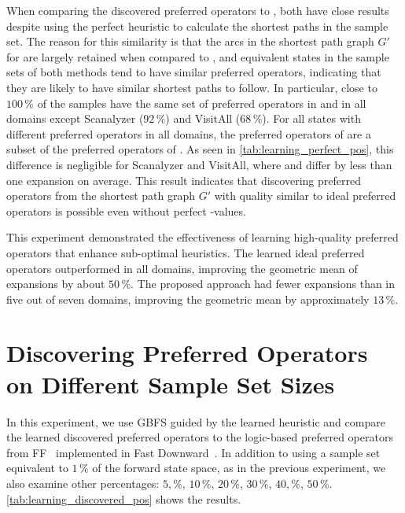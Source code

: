 \documentclass[ppgc,diss,english]{iiufrgs}
\begin{document}

When comparing the discovered preferred operators \pogstar to \pog, both have close results despite \pogstar using the perfect heuristic \hstar to calculate the shortest paths in the sample set. The reason for this similarity is that the arcs in the shortest path graph $G'$ for \pog are largely retained when compared to \pogstar, and equivalent states in the sample sets of both methods tend to have similar preferred operators, indicating that they are likely to have similar shortest paths to follow. In particular, close to $100\,\%$ of the samples have the same set of preferred operators in \pogstar and \pog in all domains except Scanalyzer ($92\,\%$) and VisitAll ($68\,\%$). For all states with different preferred operators in all domains, the preferred operators of \pog are a subset of the preferred operators of \pogstar. As seen in \cref{tab:learning_perfect_pos}, this difference is negligible for Scanalyzer and VisitAll, where \pogstar and \pog differ by less than one expansion on average. This result indicates that discovering preferred operators from the shortest path graph $G'$ with quality similar to ideal preferred operators is possible even without perfect \hstar-values.

This experiment demonstrated the effectiveness of learning high-quality preferred operators that enhance sub-optimal heuristics. The learned ideal preferred operators \postar outperformed \hnn in all domains, improving the geometric mean of expansions by about $50\,\%$. The proposed approach \pog had fewer expansions than \hnn in five out of seven domains, improving the geometric mean by approximately $13\,\%$.


\section{Discovering Preferred Operators on Different Sample Set Sizes}
\label{sec:exp-performance-po}
In this experiment, we use GBFS guided by the learned heuristic \hnn and compare the learned discovered preferred operators \pog to the logic-based preferred operators \poff from FF~\cite{Hoffmann.Nebel/2001} implemented in Fast Downward~\cite{Helmert/2006}. In addition to using a sample set equivalent to $1\,\%$ of the forward state space, as in the previous experiment, we also examine other percentages: $5,\%$, $10\,\%$, $20\,\%$, $30\,\%$, $40,\%$, $50\,\%$. \cref{tab:learning_discovered_pos} shows the results.
\end{document}
